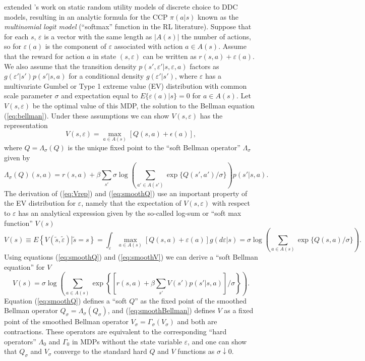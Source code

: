 \citet{rust:1987} extended \citet{mcfadden:1973}'s work on static random utility models of discrete choice 
to DDC models, resulting in an analytic formula for the CCP $\pi(a|s)$  known as 
the {\it multinomial logit model\/} (``softmax'' function in the RL literature).
Suppose that for each $s$, $\varepsilon$ is a vector with the same length as $|A(s)|$ the number of actions, so for
$\varepsilon(a)$ is the component of $\varepsilon$ associated with action $a \in A(s)$. Assume that 
the reward for action $a$ in state $(s,\varepsilon)$ can be written as $r(s,a)+\varepsilon(a)$. 
We also assume that the transition density $p(s',\varepsilon'|s,\varepsilon,a)$ factors as $g(\varepsilon'|s')p(s'|s,a)$ 
for a conditional density $g(\varepsilon'|s')$, where $\varepsilon$ has a multivariate Gumbel or Type 1 extreme value (EV) distribution 
with common scale parameter $\sigma$ and expectation equal to $E\{\varepsilon(a)|s\}=0$ for $a \in A(s)$. 
Let $V(s,\varepsilon)$ be the optimal value of this MDP, the solution to the Bellman equation (\ref{eq:bellman}). 
Under these assumptions we can show $V(s,\varepsilon)$ has the representation
\begin{equation} V(s,\varepsilon)=\max_{a \in A(s)}[Q(s,a)+\epsilon(a)],
\label{eq:Vrep}
\end{equation}
where $Q=\Lambda_\sigma(Q)$ is the unique fixed point to the ``soft Bellman operator'' $\Lambda_\sigma$ given by
\begin{equation}
    \Lambda_\sigma(Q)(s,a) = r(s,a) + \beta \sum_{s'} \sigma \log\left(\sum_{a' \in A(s')} \exp\{Q(s',a')/\sigma\}\right)p(s'|s,a).
\label{eq:smoothQ}
\end{equation}
The derivation of (\ref{eq:Vrep}) and (\ref{eq:smoothQ}) use an important
property of the EV distribution for $\varepsilon$, namely that the expectation of $V(s,\varepsilon)$ with respect to $\varepsilon$
has an  analytical expression given by the so-called log-sum or ``soft max function'' $V(s)$ 
\begin{equation}
    V(s) \equiv   E\left\{V(\tilde s,\tilde \varepsilon)\left|\tilde s=s\right\}\right. 
    =  \int_\varepsilon \max_{a \in A(s)} \left[Q(s,a)+\varepsilon(a)\right]g(d\varepsilon|s) 
    =  \sigma \log\left(\sum_{a\in A(s)} \exp\{Q(s,a)/\sigma\}\right).
\label{eq:smoothV}
\end{equation}
Using equations (\ref{eq:smoothQ}) and (\ref{eq:smoothV}) we can derive a ``soft Bellman equation'' for $V$
\begin{equation}
    V(s)= \sigma \log\left(\sum_{a\in A(s)} \exp\left\{[r(s,a)+\beta \sum_{s'} V(s')p(s'|s,a)]/\sigma\right\}\right).
 \label{eq:smoothBellman}
\end{equation}
Equation (\ref{eq:smoothQ}) defines a ``soft $Q$'' as the fixed point of the smoothed Bellman operator
$Q_\sigma=\Lambda_\sigma(Q_\sigma)$, and (\ref{eq:smoothBellman}) defines $V$ as a fixed point of the smoothed 
Bellman operator 
$V_\sigma=\Gamma_\sigma(V_\sigma)$ and both are contractions. These operators are equivalent  to the corresponding 
``hard operators'' $\Lambda_0$ and $\Gamma_0$ in MDPs without the state variable
$\varepsilon$, and one can show that $Q_\sigma$ and $V_\sigma$ converge to the standard hard 
$Q$ and $V$ functions as $\sigma \downarrow 0$. 

